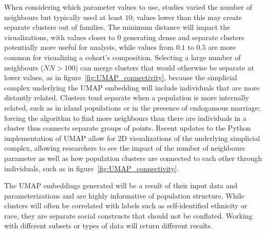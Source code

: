 \documentclass[12pt]{article}
\begin{document}
When considering which parameter values to use, studies varied the number of neighbours but typically used at least $10$; values lower than this may create separate clusters out of families. The minimum distance will impact the visualizations, with values closer to $0$ generating dense and separate clusters potentially more useful for analysis, while values from $0.1$ to $0.5$ are more common for visualizing a cohort's composition. Selecting a large number of neighbours ($NN > 100$) can merge clusters that would otherwise be separate at lower values, as in figure~\ref{fig:UMAP_connectivity}, because the simplicial complex underlying the UMAP embedding will include individuals that are more distantly related. Clusters tend separate when a population is more internally related, such as in island populations or in the presence of endogamous marriage; forcing the algorithm to find more neighbours than there are individuals in a cluster thus connects separate groups of points. Recent updates to the Python implementation of UMAP allow for 2D visualizations of the underlying simplicial complex, allowing researchers to see the impact of the number of neighbours parameter as well as how population clusters are connected to each other through individuals, such as in figure~\ref{fig:UMAP_connectivity}.

The UMAP embeddings generated will be a result of their input data and parameterizations and are highly informative of population structure. While clusters will often be correlated with labels such as self-identified ethnicity or race, they are separate social constructs that should not be conflated. Working with different subsets or types of data will return different results.


\newpage
\end{document}
